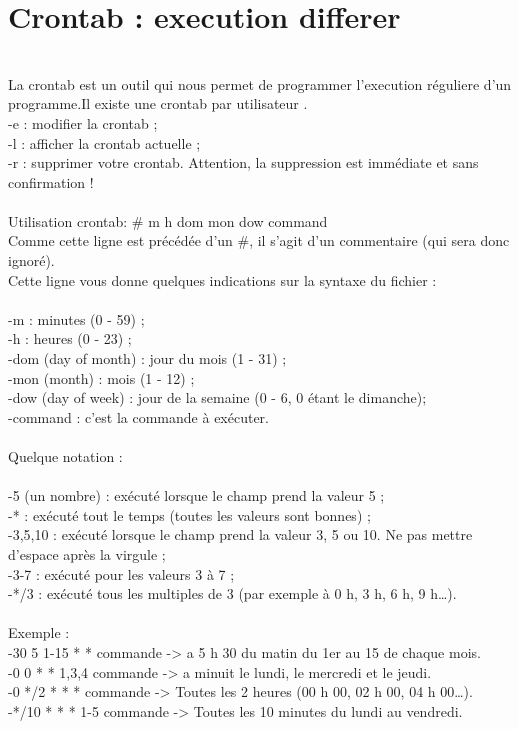 \documentclass[a4paper,12pt]{book}
\begin{document}
\section{Crontab : execution differer}
\\
La crontab est un outil qui nous permet de programmer l'execution réguliere d'un programme.Il existe une crontab par utilisateur .
\\
-e : modifier la crontab ;\\
-l : afficher la crontab actuelle ;\\
-r : supprimer votre crontab. Attention, la suppression est immédiate et sans confirmation !\\
\\
Utilisation crontab: # m h  dom mon dow   command
\\
Comme cette ligne est précédée d'un #, il s'agit d'un commentaire (qui sera donc ignoré).\\
Cette ligne vous donne quelques indications sur la syntaxe du fichier :\\
\\
-m : minutes (0 - 59) ;\\
-h : heures (0 - 23) ;\\
-dom (day of month) : jour du mois (1 - 31) ;\\
-mon (month) : mois (1 - 12) ;\\
-dow (day of week) : jour de la semaine (0 - 6, 0 étant le dimanche);\\
-command : c'est la commande à exécuter.\\
\\
Quelque notation :\\
\\
-5 (un nombre) : exécuté lorsque le champ prend la valeur 5 ;\\
-* : exécuté tout le temps (toutes les valeurs sont bonnes) ;\\
-3,5,10 : exécuté lorsque le champ prend la valeur 3, 5 ou 10. Ne pas mettre d'espace après la virgule ;\\
-3-7 : exécuté pour les valeurs 3 à 7 ;\\
-*/3 : exécuté tous les multiples de 3 (par exemple à 0 h, 3 h, 6 h, 9 h…).\\
\\
Exemple : \\
-30 5 1-15 * * commande -> a 5 h 30 du matin du 1er au 15 de chaque mois.\\
-0 0 * * 1,3,4 commande -> a minuit le lundi, le mercredi et le jeudi.\\
-0 */2 * * * commande -> Toutes les 2 heures (00 h 00, 02 h 00, 04 h 00…).\\
-*/10 * * * 1-5 commande -> Toutes les 10 minutes du lundi au vendredi.\\
\\
\end{document}
